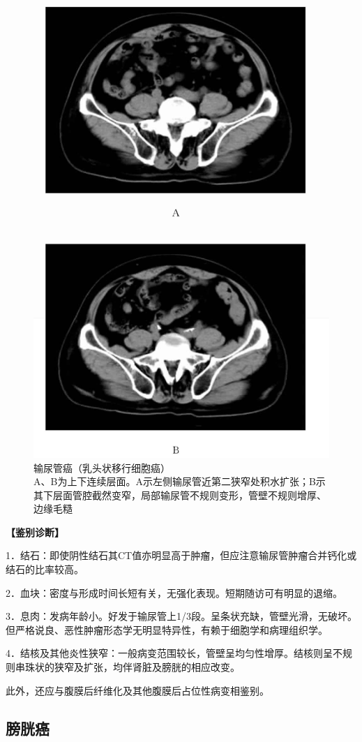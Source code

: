\begin{figure}[!htbp]
 \centering
 \includegraphics[width=.7\textwidth,height=\textheight,keepaspectratio]{./images/Image00342.jpg}
 \captionsetup{justification=centering}
 \caption{输尿管癌（乳头状移行细胞癌）\\{\small A、B为上下连续层面。A示左侧输尿管近第二狭窄处积水扩张；B示其下层面管腔截然变窄，局部输尿管不规则变形，管壁不规则增厚、边缘毛糙}}
 \label{fig15-25}
  \end{figure} 

\textbf{【鉴别诊断】}

1．结石：即使阴性结石其CT值亦明显高于肿瘤，但应注意输尿管肿瘤合并钙化或结石的比率较高。

2．血块：密度与形成时间长短有关，无强化表现。短期随访可有明显的退缩。

3．息肉：发病年龄小。好发于输尿管上1/3段。呈条状充缺，管壁光滑，无破坏。但严格说良、恶性肿瘤形态学无明显特异性，有赖于细胞学和病理组织学。

4．结核及其他炎性狭窄：一般病变范围较长，管壁呈均匀性增厚。结核则呈不规则串珠状的狭窄及扩张，均伴肾脏及膀胱的相应改变。

此外，还应与腹膜后纤维化及其他腹膜后占位性病变相鉴别。

\subsection{膀胱癌}

